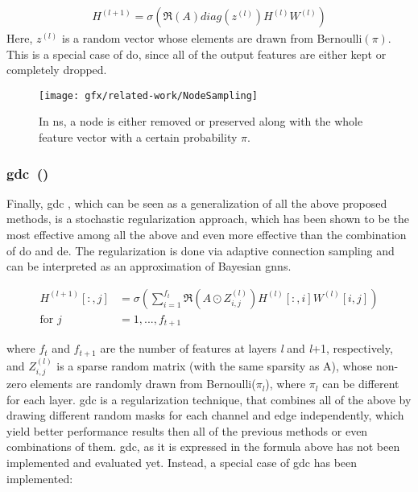 \begin{align*}
    H^{(l+1)} = \sigma (\mathfrak{R}(A) diag(z^{(l)}) H^{(l)} W^{(l)})
\end{align*}
Here, $z^{(l)}$ is a random vector whose elements are drawn from Bernoulli$(\pi)$.
This is a special case of \ac{do}, since all of the output features are either kept or
completely dropped.
\begin{figure}[ht]
    \centering
    \texttt{[image: gfx/related-work/NodeSampling]}
    \caption{In \acf{ns}, a node is either removed or preserved along with the whole feature
        vector with a certain probability $\pi$.}\label{fig:related:NodeSampling}
\end{figure}
\subsubsection{\acl*{gdc}~(\citeauthor{Hasanzadeh2020})}
\label{sec:related:pred:regularization:gdc}
Finally, \ac{gdc} \cite{Hasanzadeh2020}, which can be seen as a generalization of all the above proposed methods, is a stochastic regularization approach, which has been shown to be the most effective among all the above and even more effective than the combination of \ac{do} and \ac{de}. The regularization is done via adaptive connection sampling and can be interpreted as an approximation of Bayesian \acp{gnn}.

\begin{align*}
    H^{(l+1)}[:,j] & = \sigma \left(\sum_{i=1}^{f_{t}}\mathfrak{R}\left(A \odot Z_{i,j}^{(l)}\right)H^{(l)}[:,i]W^{(l)}[i,j]\right) \\
    \text{for } j  & = 1,..., f_{t+1}
\end{align*}

where $f_{t}$ and $f_{t+1}$ are the number of features at layers \textit{l} and \textit{l}+1, respectively, and
$Z_{i,j}^{(l)}$ is a sparse random matrix (with the same sparsity as A), whose non-zero
elements are randomly drawn from Bernoulli($\pi_{l}$), where $\pi_{l}$ can be different for each layer. \ac{gdc} is a regularization technique, that combines all of the above by drawing different random masks for each channel and edge independently, which yield better performance results then all of the previous methods or even combinations of them.
\ac{gdc}, as it is expressed in the formula above has not been implemented and evaluated yet. Instead, a special case of \ac{gdc} has been implemented:

